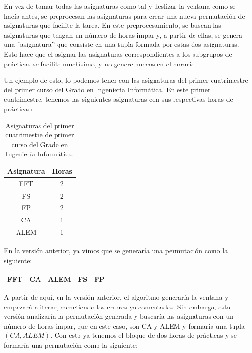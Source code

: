 En vez de tomar todas las asignaturas como tal y deslizar la ventana como se hacía antes, se preprocesan las asignaturas para crear una nueva permutación de asignaturas que facilite la tarea. En este preprocesamiento, se buscan las asignaturas que tengan un número de horas impar y, a partir de ellas, se genera una ``asignatura'' que consiste en una tupla formada por estas dos asignaturas. Esto hace que el asignar las asignaturas correspondientes a los subgrupos de prácticas se facilite muchísimo, y no genere huecos en el horario.

Un ejemplo de esto, lo podemos tener con las asignaturas del primer cuatrimestre del primer curso del Grado en Ingeniería Informática. En este primer cuatrimestre, tenemos las siguientes asignaturas con sus respectivas horas de prácticas:

\begin{table}[H]
\begin{center}
\begin{tabular}{c|c}
  Asignatura & Horas \\
  \hline
  FFT & 2 \\
  FS & 2 \\
  FP & 2 \\
  CA & 1 \\
  ALEM & 1 \\
\end{tabular}
\caption{Asignaturas del primer cuatrimestre de primer curso del Grado en Ingeniería Informática.}
\label{asigs1}
\end{center}
\end{table}

En la versión anterior, ya vimos que se generaría una permutación como la siguiente:

\begin{center}
\begin{tabular}{|c|c|c|c|c|}
\hline
FFT & CA & ALEM & FS & FP\\
\hline
\end{tabular}
\end{center}

A partir de aquí, en la versión anterior, el algoritmo generaría la ventana y empezará a iterar, cometiendo los errores ya comentados. Sin embargo, esta versión analizaría la permutación generada y buscaría las asignaturas con un número de horas impar, que en este caso, son CA y ALEM y formaría una tupla $(CA, ALEM)$. Con esto ya tenemos el bloque de dos horas de prácticas y se formaría una permutación como la siguiente:

